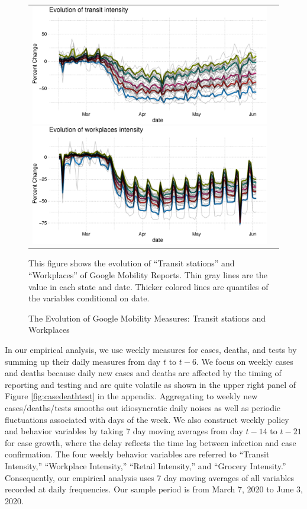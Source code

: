 \documentclass[3p, longtitle]{elsarticle}
\theoremstyle{definition}
\begin{document}
\begin{figure}\caption{The Evolution of Google Mobility Measures: Transit stations and Workplaces\label{fig:transit-workplaces}}\vspace{0.1cm}
    \begin{tabular}{cc}
      \includegraphics[width=0.5\linewidth]{tables_and_figures/transit}
      \includegraphics[width=0.5\linewidth]{tables_and_figures/workplaces}
       \end{tabular}
        \begin{flushleft}
        \scriptsize{This figure shows the evolution of ``Transit stations'' and  ``Workplaces'' of Google Mobility
      Reports. Thin gray lines are the value in each state and date. Thicker colored lines are
      quantiles of the variables conditional on date.}
      \end{flushleft}
\end{figure}



In our empirical analysis, we use weekly measures for cases, deaths,
and tests by summing up their daily measures from day \(t\) to
\(t-6\).  We focus on weekly cases and deaths because daily new cases and deaths are
affected by the timing of reporting and testing and are quite
volatile as shown in the upper right panel of Figure \ref{fig:casedeathtest} in the
appendix.  Aggregating to weekly new cases/deaths/tests smooths
out idiosyncratic daily noises as well as periodic fluctuations
associated with days of the week.
We also construct weekly policy and
behavior variables by taking 7 day moving averages from day \(t-14\) to
\(t-21\) for case growth, where the  delay reflects the time lag between infection and case confirmation. The four weekly behavior variables are referred  to ``Transit
Intensity,'' ``Workplace Intensity,'' ``Retail Intensity,'' and ``Grocery
Intensity.'' Consequently, our empirical analysis uses 7 day moving averages of all variables recorded at daily frequencies. Our sample period is from March 7, 2020 to June 3, 2020.
\end{document}
